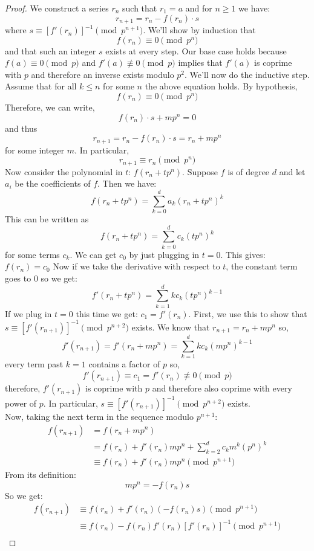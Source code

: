 \documentclass{article}
\theoremstyle{theorem}
\theoremstyle{definition}
\theoremstyle{definition}
\theoremstyle{remark}
\theoremstyle{definition}
\theoremstyle{remark}
\begin{document}
\begin{proof}
We construct a series $r_n$ such that $r_1 = a$ and for $n \ge 1$ we have:
\[r_{n+1} = r_n - f(r_n) \cdot s\]
where $s \equiv [f'(r_n)]^{-1} \pmod{p^{n+1}}$. We'll show by induction that 
\[f(r_{n}) \equiv 0 \pmod{p^{n}}\]
and that such an integer $s$ exists at every step. 
Our base case holds because $f(a) \equiv 0 \pmod{p}$ and $f'(a) \not\equiv 0 \pmod p$ implies that $f'(a)$ is coprime with $p$ and therefore an inverse exists modulo $p^2$. We'll now do the inductive step. Assume that for all $k \le n$ for some $n$ the above equation holds. By hypothesis, \[f(r_n) \equiv 0 \pmod{p^n}\]
Therefore, we can write,
\[f(r_n) \cdot s + m p^n = 0 \]
and thus
\[ r_{n + 1} = r_n - f(r_n) \cdot s = r_n + m p^n \]
for some integer $m$. In particular, 
\[r_{n+1} \equiv r_n \pmod{p^n}\]
Now consider the polynomial in $t$: $f(r_n + tp^n)$. Suppose $f$ is of degree $d$ and let $a_i$ be the coefficients of $f$. Then we have:
\[f(r_n + tp^n) = \sum_{k = 0}^d a_k(r_n + tp^n)^k\]
This can be written as 
\[f(r_n + tp^n) = \sum_{k = 0}^{d} c_k (tp^n)^k\]
for some terms $c_k$. We can get $c_0$ by just plugging in $t = 0$. This gives: $f(r_n) = c_0$ Now if we take the derivative with respect to $t$, the constant term goes to 0 so we get:
\[f'(r_n + tp^n) = \sum_{k = 1}^{d} kc_k (tp^n)^{k-1}\]
If we plug in $t = 0$ this time we get: $c_1 = f'(r_n)$. First, we use this to show that $s \equiv [f'(r_{n+1})]^{-1} \pmod{p^{n+2}}$ exists. We know that $r_{n+1} = r_{n} + mp^n$ so,
\[f'(r_{n+1}) = f'(r_n + mp^n) = \sum_{k = 1}^{d} kc_k (mp^n)^{k-1} \]
every term past $k = 1$ contains a factor of $p$ so, 
\[f'(r_{n+1}) \equiv c_1 = f'(r_n) \not\equiv 0 \pmod{p}\]
therefore, $f'(r_{n+1})$ is coprime with $p$ and therefore also coprime with every power of $p$. In particular, $s \equiv [f'(r_{n+1})]^{-1} \pmod{p^{n+2}}$ exists. \bigskip \\
Now, taking the next term in the sequence modulo $p^{n+1}$:
\begin{align*}
f(r_{n+1}) &= f(r_n + mp^n) \\
&= f(r_n) + f'(r_n)mp^n + \sum_{k = 2}^d c_km^k(p^n)^k \\
&\equiv f(r_n) + f'(r_n)mp^n \pmod {p^{n+1}}
\end{align*}
From its definition:
\[mp^n = -f(r_n)s\]
So we get:
\begin{align*}
f(r_{n+1})  &\equiv f(r_n) + f'(r_n)(-f(r_n)s) \pmod {p^{n+1}} \\
&\equiv f(r_n)-f(r_n)f'(r_n)[f'(r_n)]^{-1} \pmod {p^{n+1}}  \\

\end{align*}
\end{proof}
\end{document}
